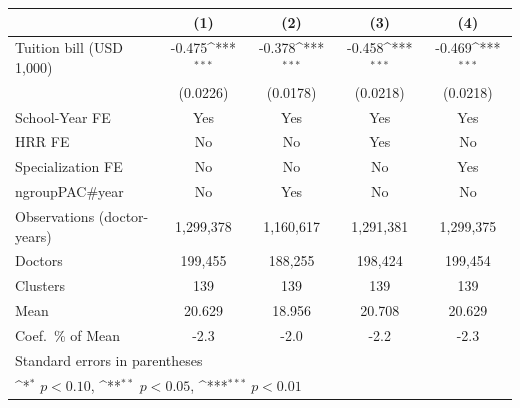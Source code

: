 {
\def\sym#1{\ifmmode^{#1}\else\(^{#1}\)\fi}
\begin{tabular}{l*{4}{c}}
\hline\hline
                    &\multicolumn{1}{c}{(1)}         &\multicolumn{1}{c}{(2)}         &\multicolumn{1}{c}{(3)}         &\multicolumn{1}{c}{(4)}         \\
\hline
Tuition bill (USD 1,000)&      -0.475\sym{***}&      -0.378\sym{***}&      -0.458\sym{***}&      -0.469\sym{***}\\
                    &    (0.0226)         &    (0.0178)         &    (0.0218)         &    (0.0218)         \\
[1em]
School-Year FE      &         Yes         &         Yes         &         Yes         &         Yes         \\
[1em]
HRR FE              &          No         &          No         &         Yes         &          No         \\
[1em]
Specialization FE   &          No         &          No         &          No         &         Yes         \\
[1em]
ngroupPAC#year      &          No         &         Yes         &          No         &          No         \\
\hline
Observations (doctor-years)&   1,299,378         &   1,160,617         &   1,291,381         &   1,299,375         \\
Doctors             &     199,455         &     188,255         &     198,424         &     199,454         \\
Clusters            &         139         &         139         &         139         &         139         \\
Mean                &      20.629         &      18.956         &      20.708         &      20.629         \\
Coef.\ \% of Mean   &        -2.3         &        -2.0         &        -2.2         &        -2.3         \\
\hline\hline
\multicolumn{5}{l}{\footnotesize Standard errors in parentheses}\\
\multicolumn{5}{l}{\footnotesize \sym{*} \(p<0.10\), \sym{**} \(p<0.05\), \sym{***} \(p<0.01\)}\\
\end{tabular}
}
